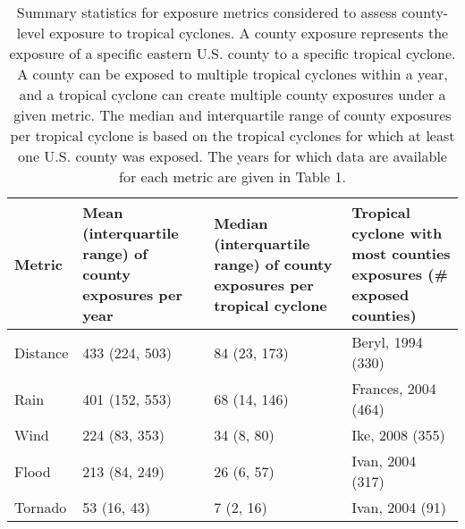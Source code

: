 \begin{table}[ht]
\centering
\caption{Summary statistics for exposure metrics considered to assess county-level exposure to
         tropical cyclones. A county exposure represents the exposure of a specific eastern U.S.  
         county to a specific tropical cyclone. A county can be exposed to multiple tropical cyclones within
         a year, and a tropical cyclone can create multiple county exposures under a given metric.
         The median and interquartile range of county exposures per tropical cyclone is based on
         the tropical cyclones for which at least one U.S. county was exposed. The years for which
         data are available for each metric are given in Table 1.} 
\label{tab:exposuresummaries}
\begin{tabular}{p{1.75cm}p{3cm}p{4cm}p{4cm}}
  \toprule
Metric & Mean (interquartile range) of county exposures per year & Median (interquartile range) of county exposures per tropical cyclone & Tropical cyclone with most counties exposures (\# exposed counties) \\ 
  \midrule
Distance & 433 (224, 503) & 84 (23, 173) & Beryl, 1994 (330) \\ 
  Rain & 401 (152, 553) & 68 (14, 146) & Frances, 2004 (464) \\ 
  Wind & 224 (83, 353) & 34 (8, 80) & Ike, 2008 (355) \\ 
  Flood & 213 (84, 249) & 26 (6, 57) & Ivan, 2004 (317) \\ 
  Tornado & 53 (16, 43) & 7 (2, 16) & Ivan, 2004 (91) \\ 
   \bottomrule
\end{tabular}
\end{table}
